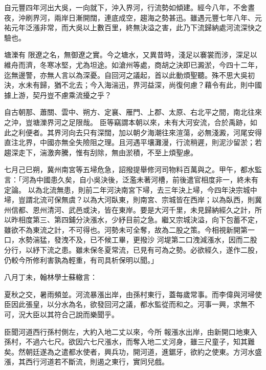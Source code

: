 \begin{pinyinscope}
 自元豐四年河出大吳，一向就下，沖入界河，行流勢如傾建。經今八年，不舍晝夜，沖刷界河，兩岸日漸開闊，連底成空，趨海之勢甚迅。雖遇元豐七年八年、元祐元年泛漲非常，而大吳以上數百里，終無決溢之害，此乃下流歸納處河流深快之驗也。



 塘濼有
 限遼之名，無御遼之實。今之塘水，又異昔時，淺足以褰裳而涉，深足以維舟而濟，冬寒冰堅，尤為坦途。如滄州等處，商胡之決即已澱淤，今四十二年，迄無邊警，亦無人言以為深憂。自回河之議起，首以此動煩聖聽。殊不思大吳初決，水未有歸，猶不北去；今入海湍迅，界河益深，尚復何慮？藉令有此，則中國據上游，契丹豈不慮乘流擾之乎？



 自古朝那、蕭關、雲中、朔方、定襄、雁門、上郡、太原、右北平之間，南北往來之沖，豈塘濼界河之足限哉。
 臣等竊謂本朝以來，未有大河安流，合於禹跡，如此之利便者。其界河向去只有深闊，加以朝夕海潮往來渲蕩，必無淺澱，河尾安得直注北界，中國亦無全失險阻之理。且河遇平壤灘漫，行流稍遲，則泥沙留淤；若趨深走下，湍激奔騰，惟有刮除，無由淤積，不至上煩聖慮。



 七月己巳朔，冀州南宮等五埽危急，詔撥提舉修河司物料百萬與之。甲午，都水監言：「河為中國患久矣，自小吳決後，泛濫未著河槽，前後遣官相度非一，終未有定論。
 以為北流無患，則前二年河決南宮下埽，去三年決上埽，今四年決宗城中埽，豈謂北流可保無虞？以為大河臥東，則南宮、宗城皆在西岸；以為臥西，則冀州信都、恩州清河、武邑或決，皆在東岸。要是大河千里，未見歸納經久之計，所以昨相度第三、第四鋪分決漲水，少紓目前之急。繼又宗城決溢，向下包蓄不定，雖欲不為東流之計，不可得也。河勢未可全奪，故為二股之策。今相視新開第一口，水勢湍猛，發洩不及，已不候工畢，更撥沙
 河堤第二口洩減漲水，因而二股分行，以紓下流之患。雖未保冬夏常流，已見有可為之勢。必欲經久，遂作二股，仍較今所修利害孰為輕重，有司具析保明以聞。」



 八月丁未，翰林學士蘇轍言：



 夏秋之交，暑雨頻並。河流暴漲出岸，由孫村東行，蓋每歲常事。而李偉與河埽使臣因此張皇，以分水為名，欲發回河之議，都水監從而和之。河事一興，求無不可，況大臣以其符合己說而樂聞乎。



 臣聞河道西行孫村側左，大約入地二丈以來，今所
 報漲水出岸，由新開口地東入孫村，不過六七尺。欲因六七尺漲水，而奪入地二丈河身，雖三尺童子，知其難矣。然朝廷遂為之遣都水使者，興兵功，開河道，進鋸牙，欲約之使東。方河水盛漲，其西行河道若不斷流，則遏之東行，實同兒戲。




\end{pinyinscope}
